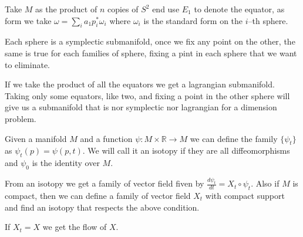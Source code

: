 \documentclass[misc]{subfiles}
\begin{document}
\begin{Exp}
    Take $M$ as the product of $n$ copies of $S^2$ end use $E_1$ to denote the equator, as form we take $\omega=\sum_i a_1 p^\ast_i \omega_i$ where $\omega_i$ is the standard form on the $i$--th sphere.

    Each sphere is a symplectic submanifold, once we fix any point on the other, the same is true for each families of sphere, fixing a pint in each sphere that we want to eliminate.

    If we take the product of all the equators we get a lagrangian submanifold. Taking only some equators, like two, and fixing a point in the other sphere will give us a submanifold that is nor symplectic nor lagrangian for a dimension problem.
\end{Exp}

\begin{Dfn}
    Given a manifold $M$ and a function $\psi: M \times \mathbb{R} \rightarrow M$ we can define the family $\{\psi_t\}$ as $\psi_t(p)=\psi(p,t)$. We will call it an isotopy if they are all diffeomorphisms and $\psi_0$ is the identity over $M$.

    From an isotopy we get a family of vector field fiven by $\frac{d\psi_t}{dt}=X_t \circ \psi_t$. Also if $M$ is compact, then we can define a family of vector field $X_t$ with compact support and find an isotopy that respects the above condition.

    If $X_t=X$ we get the flow of $X$.
\end{Dfn}

\end{document}
